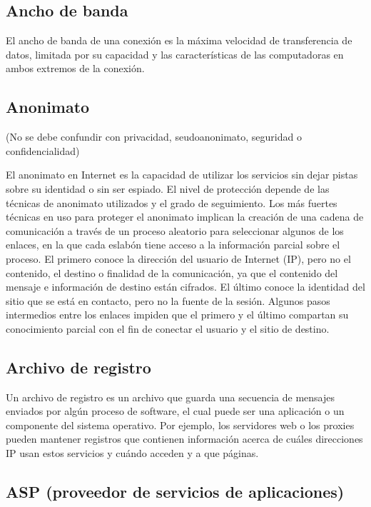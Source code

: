 \subsection{Ancho de banda}\label{ancho-de-banda}

El ancho de banda de una conexión es la máxima velocidad de
transferencia de datos, limitada por su capacidad y las características
de las computadoras en ambos extremos de la conexión.

\subsection{Anonimato}\label{anonimato}

(No se debe confundir con privacidad, seudoanonimato, seguridad o
confidencialidad)

El anonimato en Internet es la capacidad de utilizar los servicios sin
dejar pistas sobre su identidad o sin ser espiado. El nivel de
protección depende de las técnicas de anonimato utilizados y el grado de
seguimiento. Los más fuertes técnicas en uso para proteger el anonimato
implican la creación de una cadena de comunicación a través de un
proceso aleatorio para seleccionar algunos de los enlaces, en la que
cada eslabón tiene acceso a la información parcial sobre el proceso. El
primero conoce la dirección del usuario de Internet (IP), pero no el
contenido, el destino o finalidad de la comunicación, ya que el
contenido del mensaje e información de destino están cifrados. El último
conoce la identidad del sitio que se está en contacto, pero no la fuente
de la sesión. Algunos pasos intermedios entre los enlaces impiden que el
primero y el último compartan su conocimiento parcial con el fin de
conectar el usuario y el sitio de destino.

\subsection{Archivo de registro}\label{archivo-de-registro}

Un archivo de registro es un archivo que guarda una secuencia de
mensajes enviados por algún proceso de software, el cual puede ser una
aplicación o un componente del sistema operativo. Por ejemplo, los
servidores web o los proxies pueden mantener registros que contienen
información acerca de cuáles direcciones IP usan estos servicios y
cuándo acceden y a que páginas.

\subsection{ASP (proveedor de servicios de
aplicaciones)}\label{asp-proveedor-de-servicios-de-aplicaciones}

